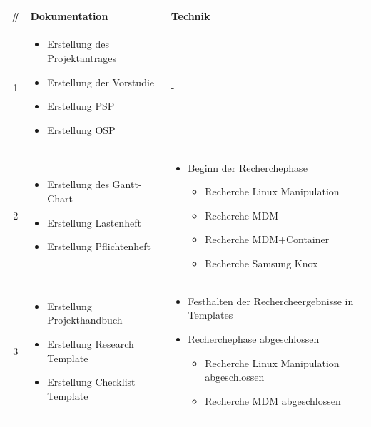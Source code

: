 \begin{table}
	\centering
	\begin{tabular}{| c | p{6cm} | p{7cm} |}
		\hline
		\textbf \# & \textbf{Dokumentation} & \textbf{Technik}
		\\\hline %
		1 
		&%
		\begin{itemize}
			\item Erstellung des Projektantrages
			\item Erstellung der Vorstudie
			\item Erstellung PSP
			\item Erstellung OSP
		\end{itemize}
		&%
		-
		\\\hline %
		2
		&%
		\begin{itemize}
			\item Erstellung des Gantt-Chart
			\item Erstellung Lastenheft
			\item Erstellung Pflichtenheft
		\end{itemize}
		&%
		\begin{itemize}
			\item Beginn der Recherchephase
			\begin{itemize}
				\item Recherche Linux Manipulation
				\item Recherche MDM
				\item Recherche MDM+Container
				\item Recherche Samsung Knox
			\end{itemize}
		\end{itemize}
		\\\hline %
		3
		&%
		\begin{itemize}
			\item Erstellung Projekthandbuch
			\item Erstellung Research Template
			\item Erstellung Checklist Template
		\end{itemize}
		&%
		\begin{itemize}
			\item Festhalten der Rechercheergebnisse in Templates
			\item Recherchephase abgeschlossen
			\begin{itemize}
				\item Recherche Linux Manipulation abgeschlossen
				\item Recherche MDM abgeschlossen

\end{itemize}
\end{itemize}
\end{tabular}
\end{table}
